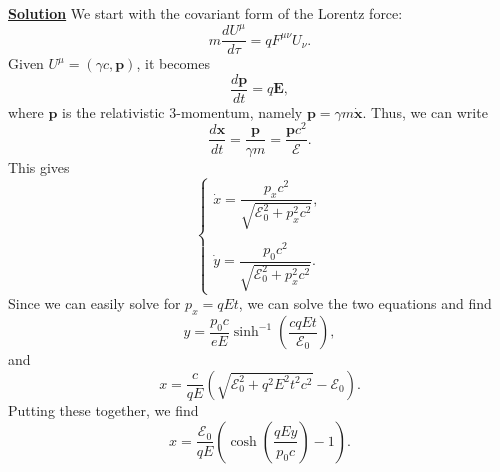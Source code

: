 \noindent \underline{\textbf{Solution}} We start with the covariant form of the Lorentz force:
\begin{equation}
    m\frac{dU^\mu}{d\tau} = qF^{\mu\nu}U_\nu.
\end{equation}
Given $U^\mu = (\gamma c, \mathbf{p})$, it becomes
\begin{equation}
    \frac{d\mathbf{p}}{dt} = q\mathbf{E},
\end{equation}
where $\mathbf{p}$ is the relativistic 3-momentum, namely $\mathbf{p} = \gamma m \dot{\mathbf{x}}$. Thus, we can write
\begin{equation}
    \frac{d\mathbf{x}}{dt} = \frac{\mathbf{p}}{\gamma m} = \frac{\mathbf{p}c^2}{\mathcal{E}}.
\end{equation}
This gives
\begin{equation}
    \begin{cases}
        \dot{x} = \dfrac{p_xc^2}{\sqrt{\mathcal{E}_0^2+p_x^2c^2}},\\
        \\
        \dot{y} = \dfrac{p_0c^2}{\sqrt{\mathcal{E}_0^2+p_x^2c^2}}.
        
    \end{cases}
    \label{eq:2}
\end{equation}
Since we can easily solve for $p_x = qEt$, we can solve the two equations and find
\begin{equation}
     y = \frac{p_0c}{eE}\sinh^{-1}\left(\frac{cqEt}{\mathcal{E}_0}\right),
\end{equation}
and
\begin{equation}
    x = \frac{c}{qE}\left(\sqrt{\mathcal{E}_0^2+q^2E^2t^2c^2}-\mathcal{E}_0\right).
\end{equation}
Putting these together, we find
\begin{equation}
    x = \frac{\mathcal{E}_0}{qE}\left(\cosh\!\left(\frac{qEy}{p_0 c}\right)-1\right).
\end{equation}
